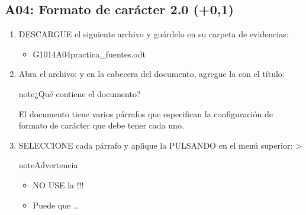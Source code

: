 \documentclass[letterpaper,10pt,spanish]{sphinxmanual}
\begin{document}
\subsection{A04: Formato de carácter 2.0  (+0,1)}
\label{\detokenize{1_guias/10ofimatica/G1014:a04-formato-de-caracter-2-0-102-0-1}}
\sphinxAtStartPar
{}
\begin{enumerate}
%
\item {} 
\sphinxAtStartPar
DESCARGUE el siguiente archivo y guárdelo en su carpeta de evidencias:
\begin{itemize}
\item {} 
\sphinxAtStartPar
G1014A04\sphinxhyphen{}practica\_fuentes.odt 

\end{itemize}

\item {} 
\sphinxAtStartPar
Abra el archivo:  y en la cabecera del documento, agregue la  con el título: 

\begin{sphinxadmonition}{note}{¿Qué contiene el documento?}

\sphinxAtStartPar
El documento tiene varios párrafos que especifican la configuración de formato de carácter que debe tener cada uno.
\end{sphinxadmonition}

\item {} 
\sphinxAtStartPar
SELECCIONE cada párrafo y aplique la  PULSANDO en el menú superior:  > 

\begin{sphinxadmonition}{note}{Advertencia}
\begin{itemize}
\item {} 
\sphinxAtStartPar
NO USE la !!!

\item {} 
\sphinxAtStartPar
Puede que …


\end{itemize}
\end{sphinxadmonition}
\end{enumerate}
\end{document}
